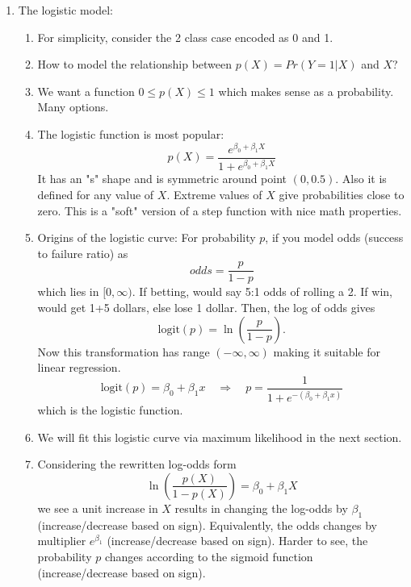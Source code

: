 \documentclass{article}
\begin{document}
\begin{enumerate}
\item The logistic model:
\begin{enumerate}
\item For simplicity, consider the 2 class case encoded as 0 and 1.
\item How to model the relationship between $p(X) = Pr(Y=1|X)$ and $X$?
\item We want a function $0 \leq p(X) \leq 1$ which makes sense as a probability. Many options.
\item The logistic function is most popular:
\[
p(X) = \frac{e^{\beta_0 + \beta_1 X}}{1 + e^{\beta_0 + \beta_1 X}}
\]
It has an "s" shape and is symmetric around point $(0, 0.5)$. Also it is defined for any value of $X$. Extreme values of $X$ give probabilities close to zero. This is a "soft" version of a step function with nice math properties.
\item Origins of the logistic curve: For probability $p$, if you model odds (success to failure ratio) as
\[
odds = \frac{p}{1-p}
\]
which lies in $[0,\infty)$.
If betting, would say 5:1 odds of rolling a 2. If win, would get 1+5 dollars, else lose 1 dollar.
Then, the log of odds gives
\[
\text{logit}(p) = \ln\left( \frac{p}{1-p} \right).
\]
Now this transformation has range $(-\infty, \infty)$ making it suitable for linear regression.
\[
\text{logit}(p) = \beta_0 + \beta_1 x \quad \Rightarrow \quad p = \frac{1}{1 + e^{-(\beta_0 + \beta_1 x)}}
\]
which is the logistic function.
\item We will fit this logistic curve via maximum likelihood in the next section.
\item Considering the rewritten log-odds form
\[
\ln\left( \frac{p(X)}{1-p(X)}\right) = \beta_0 + \beta_1 X
\]
we see a unit increase in $X$ results in changing the log-odds by $\beta_1$ (increase/decrease based on sign). Equivalently, the odds changes by multiplier $e^{\beta_1}$ (increase/decrease based on sign). Harder to see, the probability $p$ changes according to the sigmoid function (increase/decrease based on sign).
\end{enumerate}


\end{enumerate}
\end{document}
